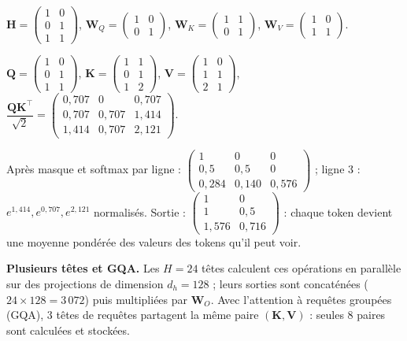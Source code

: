 \documentclass[11pt,a4paper]{article}
\newcommand{\mat}[1]{\mathbf{#1}}
\begin{document}
\begin{exemple}[(attention sur 3 tokens, $d_h = 2$)]
$\mat{H}=\begin{pmatrix}1&0\\0&1\\1&1\end{pmatrix}$,
$\mat{W}_Q=\begin{pmatrix}1&0\\0&1\end{pmatrix}$,
$\mat{W}_K=\begin{pmatrix}1&1\\0&1\end{pmatrix}$,
$\mat{W}_V=\begin{pmatrix}1&0\\1&1\end{pmatrix}$.

$\mat{Q}=\begin{pmatrix}1&0\\0&1\\1&1\end{pmatrix}$,
$\mat{K}=\begin{pmatrix}1&1\\0&1\\1&2\end{pmatrix}$,
$\mat{V}=\begin{pmatrix}1&0\\1&1\\2&1\end{pmatrix}$,
$\dfrac{\mat{Q}\mat{K}^\top}{\sqrt2}=\begin{pmatrix}0{,}707&0&0{,}707\\0{,}707&0{,}707&1{,}414\\1{,}414&0{,}707&2{,}121\end{pmatrix}$.

Après masque et softmax par ligne :
$\begin{pmatrix}1&0&0\\0{,}5&0{,}5&0\\0{,}284&0{,}140&0{,}576\end{pmatrix}$ ; ligne 3 :
$e^{1{,}414},e^{0{,}707},e^{2{,}121}$ normalisés.
Sortie : $\begin{pmatrix}1&0\\1&0{,}5\\1{,}576&0{,}716\end{pmatrix}$ : chaque token devient une
moyenne pondérée des valeurs des tokens qu'il peut voir.
\end{exemple}

\textbf{Plusieurs têtes et GQA.} Les $H=24$ têtes calculent ces opérations en parallèle sur des
projections de dimension $d_h=128$ ; leurs sorties sont concaténées ($24\times128=3\,072$) puis
multipliées par $\mat{W}_O$. Avec l'attention à requêtes groupées (GQA), 3 têtes de requêtes
partagent la même paire $(\mat{K},\mat{V})$ : seules 8 paires sont calculées et stockées.
\end{document}
